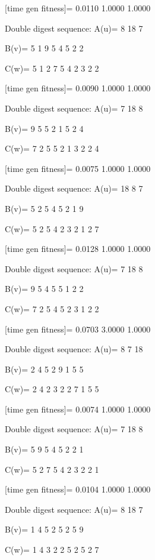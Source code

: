 [time gen fitness]=
    0.0110    1.0000    1.0000

Double digest sequence:
A(u)=
     8    18     7

B(v)=
     5     1     9     5     4     5     2     2

C(w)=
     5     1     2     7     5     4     2     3     2     2

[time gen fitness]=
    0.0090    1.0000    1.0000

Double digest sequence:
A(u)=
     7    18     8

B(v)=
     9     5     5     2     1     5     2     4

C(w)=
     7     2     5     5     2     1     3     2     2     4

[time gen fitness]=
    0.0075    1.0000    1.0000

Double digest sequence:
A(u)=
    18     8     7

B(v)=
     5     2     5     4     5     2     1     9

C(w)=
     5     2     5     4     2     3     2     1     2     7

[time gen fitness]=
    0.0128    1.0000    1.0000

Double digest sequence:
A(u)=
     7    18     8

B(v)=
     9     5     4     5     5     1     2     2

C(w)=
     7     2     5     4     5     2     3     1     2     2

[time gen fitness]=
    0.0703    3.0000    1.0000

Double digest sequence:
A(u)=
     8     7    18

B(v)=
     2     4     5     2     9     1     5     5

C(w)=
     2     4     2     3     2     2     7     1     5     5

[time gen fitness]=
    0.0074    1.0000    1.0000

Double digest sequence:
A(u)=
     7    18     8

B(v)=
     5     9     5     4     5     2     2     1

C(w)=
     5     2     7     5     4     2     3     2     2     1

[time gen fitness]=
    0.0104    1.0000    1.0000

Double digest sequence:
A(u)=
     8    18     7

B(v)=
     1     4     5     2     5     2     5     9

C(w)=
     1     4     3     2     2     5     2     5     2     7

